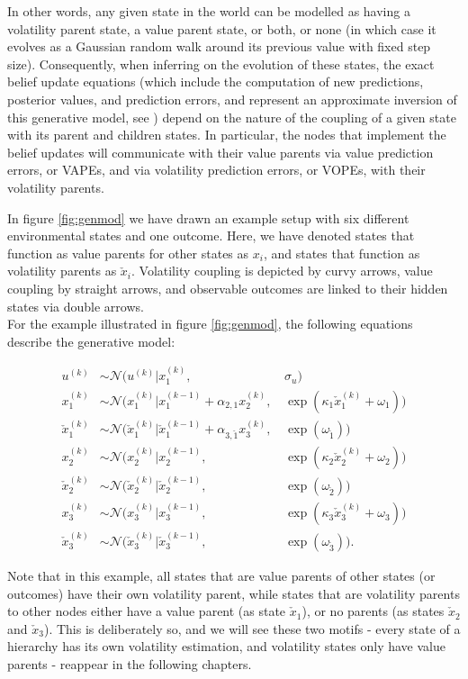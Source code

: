 In other words, any given state in the world can be modelled as having a volatility parent state, a value parent state, or both, or none (in which case it evolves as a Gaussian random walk around its previous value with fixed step size). Consequently, when inferring on the evolution of these states, the exact belief update equations (which include the computation of new predictions, posterior values, and prediction errors, and represent an approximate inversion of this generative model, see \cite{Mathys2011}) depend on the nature of the coupling of a given state with its parent and children states. In particular, the nodes that implement the belief updates will communicate with their value parents via value prediction errors, or \textsf{VAPE}s, and via volatility prediction errors, or \textsf{VOPE}s, with their volatility parents.\\


In figure \ref{fig:genmod} we have drawn an example setup with six different environmental states and one outcome. Here, we have denoted states that function as value parents for other states as $x_i$, and states that function as volatility parents as $\check{x}_i$. Volatility coupling is depicted by curvy arrows, value coupling by straight arrows, and observable outcomes are linked to their hidden states via double arrows. \\

For the example illustrated in figure \ref{fig:genmod}, the following equations describe the generative model:

\begin{align}
    u^{(k)}             &\sim \mathcal{N}(u^{(k)} | x_1^{(k)}, \, &\sigma_u)\\
    x_1^{(k)}           &\sim \mathcal{N}(x_1^{(k)} | x_1^{(k-1)} + \alpha_{2,1} x_2^{(k)}, \, &\exp(\kappa_1 \check{x}_1^{(k)} + \omega_1))\\
    \check{x}_1^{(k)}   &\sim \mathcal{N}(\check{x}_1^{(k)} | \check{x}_1^{(k-1)} + \alpha_{3,\check{1}} x_3^{(k)}, \, &\exp(\omega_{\check{1}}))\\
    x_2^{(k)}           &\sim \mathcal{N}(x_2^{(k)} | x_2^{(k-1)}, \, &\exp(\kappa_2 \check{x}_2^{(k)} + \omega_2))\\
    \check{x}_2^{(k)}   &\sim \mathcal{N}(\check{x}_2^{(k)} | \check{x}_2^{(k-1)}, \, &\exp(\omega_{\check{2}}))\\
    x_3^{(k)}           &\sim \mathcal{N}(x_3^{(k)} | x_3^{(k-1)}, \, &\exp(\kappa_3 \check{x}_3^{(k)} + \omega_3))\\
    \check{x}_3^{(k)}   &\sim \mathcal{N}(\check{x}_3^{(k)} | \check{x}_3^{(k-1)}, \, &\exp(\omega_{\check{3}})).
\end{align}

Note that in this example, all states that are value parents of other states (or outcomes) have their own volatility parent, while states that are volatility parents to other nodes either have a value parent (as state $\check{x}_1$), or no parents (as states $\check{x}_2$ and $\check{x}_3$). This is deliberately so, and we will see these two motifs - every state of a hierarchy has its own volatility estimation, and volatility states only have value parents - reappear in the following chapters.